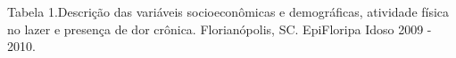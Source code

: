\documentclass{article}
\begin{document}
Tabela 1.Descrição das variáveis socioeconômicas e demográficas, atividade
física no lazer e presença de dor crônica. Florianópolis, SC. EpiFloripa Idoso
2009 - 2010.
















\end{document}
